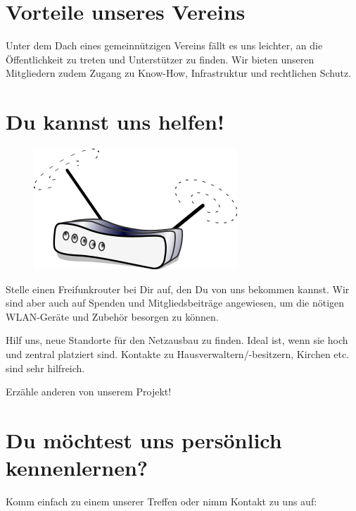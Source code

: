 \documentclass[10pt]{scrartcl}
\begin{document}
\newpage
{}

\section{\normalsize Vorteile unseres Vereins}
Unter dem Dach eines gemeinnützigen Vereins fällt es uns leichter, an die Öffentlichkeit zu treten und Unterstützer zu finden. Wir bieten unseren Mitgliedern zudem Zugang zu Know-How, Infrastruktur und rechtlichen Schutz.

\section{\normalsize Du kannst uns helfen!}
\begin{figure}
\includegraphics[scale=0.4]{Router}
\end{figure}
Stelle einen Freifunkrouter bei Dir auf, den Du von uns bekommen kannst. Wir sind aber auch auf Spenden und Mitgliedsbeiträge angewiesen, um die nötigen WLAN-Geräte und Zubehör besorgen zu können.

Hilf uns, neue Standorte für den Netzausbau zu finden. Ideal ist, wenn sie hoch und zentral platziert sind. Kontakte zu Hausverwaltern/-besitzern, Kirchen etc. sind sehr hilfreich.

Erzähle anderen von unserem Projekt!

\section{\normalsize Du möchtest uns persönlich kennenlernen?}
Komm einfach zu einem unserer Treffen oder nimm Kontakt zu uns auf:
\end{document}
